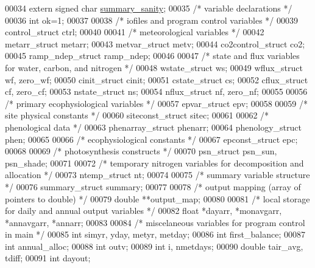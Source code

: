 \begin{DoxyCode}
00034     \textcolor{keyword}{extern} \textcolor{keywordtype}{signed} \textcolor{keywordtype}{char} \hyperlink{bgc_8c_ad321968d4dfc678d949b512629eefe6f}{summary\_sanity};
00035     \textcolor{comment}{/* variable declarations */}
00036     \textcolor{keywordtype}{int} ok=1;
00037 
00038     \textcolor{comment}{/* iofiles and program control variables */}
00039     control\_struct     ctrl;
00040 
00041     \textcolor{comment}{/* meteorological variables */}
00042     metarr\_struct      metarr;
00043     metvar\_struct      metv;
00044     co2control\_struct  co2;
00045     ramp\_ndep\_struct ramp\_ndep;
00046     
00047     \textcolor{comment}{/* state and flux variables for water, carbon, and nitrogen */}
00048     wstate\_struct      ws;
00049     wflux\_struct       wf, zero\_wf;
00050     cinit\_struct       cinit;
00051     cstate\_struct      cs;
00052     cflux\_struct       cf, zero\_cf;
00053     nstate\_struct      ns;
00054     nflux\_struct       nf, zero\_nf;
00055 
00056     \textcolor{comment}{/* primary ecophysiological variables */}
00057     epvar\_struct       epv;
00058 
00059     \textcolor{comment}{/* site physical constants */}
00060     siteconst\_struct   sitec;
00061 
00062     \textcolor{comment}{/* phenological data */}
00063     phenarray\_struct   phenarr;
00064     phenology\_struct   phen;
00065 
00066     \textcolor{comment}{/* ecophysiological constants */}
00067     epconst\_struct     epc;
00068 
00069     \textcolor{comment}{/* photosynthesis constructs */}
00070     psn\_struct         psn\_sun, psn\_shade;
00071 
00072     \textcolor{comment}{/* temporary nitrogen variables for decomposition and allocation */}
00073     ntemp\_struct       nt;
00074     
00075     \textcolor{comment}{/* summary variable structure */}
00076     summary\_struct     summary;
00077     
00078     \textcolor{comment}{/* output mapping (array of pointers to double) */}
00079     \textcolor{keywordtype}{double} **output\_map;
00080     
00081     \textcolor{comment}{/* local storage for daily and annual output variables */}
00082     \textcolor{keywordtype}{float} *dayarr, *monavgarr, *annavgarr, *annarr;
00083 
00084     \textcolor{comment}{/* miscelaneous variables for program control in main */}
00085     \textcolor{keywordtype}{int} simyr, yday, metyr, metday;
00086     \textcolor{keywordtype}{int} first\_balance;
00087     \textcolor{keywordtype}{int} annual\_alloc;
00088     \textcolor{keywordtype}{int} outv;
00089     \textcolor{keywordtype}{int} i, nmetdays;
00090     \textcolor{keywordtype}{double} tair\_avg, tdiff;
00091     \textcolor{keywordtype}{int} dayout;

\end{DoxyCode}

